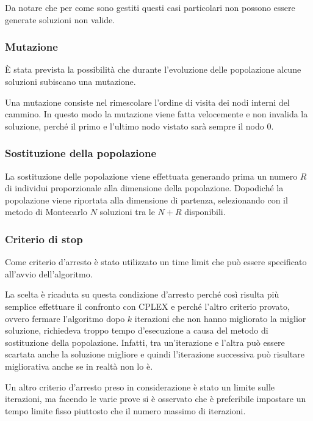 Da notare che per come sono gestiti questi casi particolari non possono essere generate soluzioni non valide.

\subsubsection{Mutazione}

\`E stata prevista la possibilità che durante l'evoluzione delle popolazione alcune soluzioni subiscano una mutazione.

Una mutazione consiste nel rimescolare l'ordine di visita dei nodi interni del cammino. In questo modo la mutazione viene fatta velocemente e non invalida la soluzione, perché il primo e l'ultimo nodo vistato sarà sempre il nodo 0.

\subsubsection{Sostituzione della popolazione}

La sostituzione delle popolazione viene effettuata generando prima un numero $R$ di individui proporzionale alla dimensione della popolazione. Dopodiché la popolazione viene riportata alla dimensione di partenza, selezionando con il metodo di Montecarlo $N$ soluzioni tra le $N+R$ disponibili.

\subsubsection{Criterio di stop}

Come criterio d'arresto è stato utilizzato un time limit che può essere specificato all'avvio dell'algoritmo.

La scelta è ricaduta su questa condizione d'arresto perché così risulta più semplice effettuare il confronto con CPLEX e perché l'altro criterio provato, ovvero fermare l'algoritmo dopo $k$ iterazioni che non hanno migliorato la miglior soluzione, richiedeva troppo tempo d'esecuzione a causa del metodo di sostituzione della popolazione.
Infatti, tra un'iterazione e l'altra può essere scartata anche la soluzione migliore e quindi l'iterazione successiva può risultare migliorativa anche se in realtà non lo è.

Un altro criterio d'arresto preso in considerazione è stato un limite sulle iterazioni, ma facendo le varie prove si è osservato che è preferibile impostare un tempo limite fisso piuttosto che il numero massimo di iterazioni.

